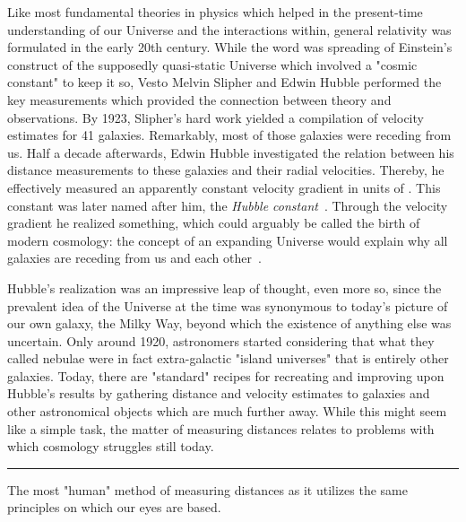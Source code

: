 
Like most fundamental theories in physics which helped in the present-time
understanding of our Universe and the interactions within, general relativity
was formulated in the early 20th century.  While the word was spreading of
Einstein's construct of the supposedly quasi-static Universe which involved a
"cosmic constant" to keep it so, Vesto Melvin Slipher and Edwin Hubble performed
the key measurements which provided the connection between theory and
observations.  By 1923, Slipher's hard work yielded a compilation of velocity
estimates for 41 galaxies.  Remarkably, most of those galaxies were receding
from us.  Half a decade afterwards, Edwin Hubble investigated the relation
between his distance measurements to these galaxies and their radial velocities.
Thereby, he effectively measured an apparently constant velocity gradient in
units of \Hunitsalt.  This constant was later named after him, the
\textit{Hubble constant}~\Ho.  Through the velocity gradient he realized
something, which could arguably be called the birth of modern cosmology: the
concept of an expanding Universe would explain why all galaxies are receding
from us and each other~.  

Hubble's realization was an impressive leap of thought, even more so, since the
prevalent idea of the Universe at the time was synonymous to today's picture of
our own galaxy, the Milky Way, beyond which the existence of anything else was
uncertain.  Only around 1920, astronomers started considering that what they
called nebulae were in fact extra-galactic "island universes" that is entirely
other galaxies.  Today, there are "standard" recipes for recreating and
improving upon Hubble's results by gathering distance and velocity estimates to
galaxies and other astronomical objects which are much further away.  While this
might seem like a simple task, the matter of measuring distances relates to
problems with which cosmology struggles still today.  

\par\noindent\rule{\textwidth}{0.8pt}

The most "human" method of measuring distances as it utilizes the same
principles on which our eyes are based.

